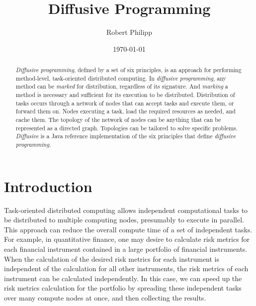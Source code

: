 \documentclass[11pt]{article}
\begin{document}
\title{Diffusive Programming}
\author{Robert Philipp}
\date{\today}
\maketitle

%
%
\begin{abstract}
\emph{Diffusive programming}, defined by a set of six principles, is an approach for performing method-level, task-oriented distributed computing. In \emph{diffusive programming}, any method can be \emph{marked} for distribution, regardless of its signature. And \emph{marking} a method is necessary and sufficient for its execution to be distributed. Distribution of tasks occurs through a network of nodes that can accept tasks and execute them, or forward them on. Nodes executing a task, load the required resources as needed, and cache them. The topology of the network of nodes can be anything that can be represented as a directed graph. Topologies can be tailored to solve specific problems. \emph{Diffusive} is a Java reference implementation of the six principles that define \emph{diffusive programming}.
\end{abstract}
%
%
\section{Introduction}
Task-oriented distributed computing allows independent computational tasks to be distributed to multiple computing nodes, presumably to execute in parallel. This approach can reduce the overall compute time of a set of independent tasks. For example, in quantitative finance, one may desire to calculate risk metrics for each financial instrument contained in a large portfolio of financial instruments. When the calculation of the desired risk metrics for each instrument is independent of the calculation for all other instruments, the risk metrics of each instrument can be calculated independently. In this case, we can speed up the risk metrics calculation for the portfolio by spreading these independent tasks over many compute nodes at once, and then collecting the results.
\end{document}
